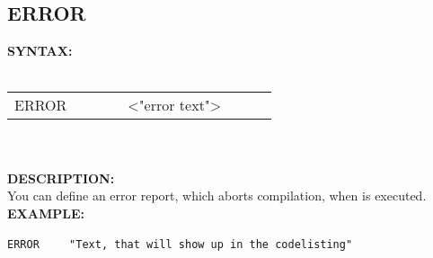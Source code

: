 {                \subsection{ERROR}
                \textbf{SYNTAX:}\\
                \\ {
                    \texttt{}
                    \begin{tabular}[h!]{llll}
                        { \color{highlight_directive} ERROR }\verb`       `{ \color{highlight_string} <"error text"> }
                    \end{tabular}
                    }\\
                    \\
                \textbf{DESCRIPTION:}\\
                You can define an error report, which aborts compilation, when is executed.  \\
                \textbf{EXAMPLE:}\\
                        \begin{code}[h!]
                            {\color{highlight_directive}\verb'ERROR'}\verb'    '
                            {\color{highlight_constant}\verb'"Text, that will show up in the codelisting"'}
                        \end{code}

}
